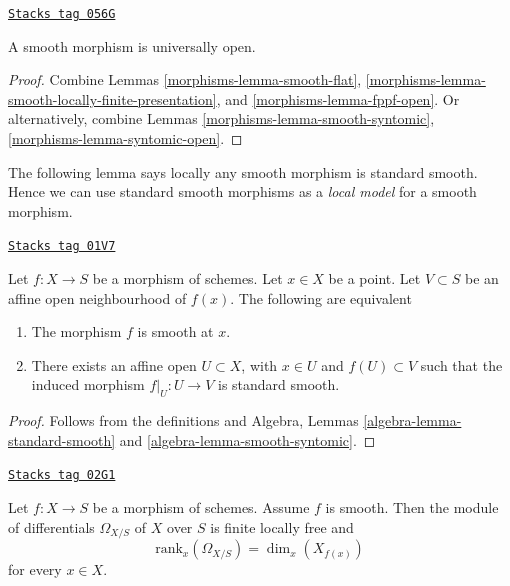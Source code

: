 \begin{lemma}
\label{morphisms-lemma-smooth-open}
\href{https://stacks.math.columbia.edu/tag/056G}{\texttt{Stacks tag 056G}}

A smooth morphism is universally open.
\end{lemma}

\begin{proof}

Combine
Lemmas \ref{morphisms-lemma-smooth-flat},
\ref{morphisms-lemma-smooth-locally-finite-presentation}, and
\ref{morphisms-lemma-fppf-open}.
Or alternatively, combine
Lemmas \ref{morphisms-lemma-smooth-syntomic},
\ref{morphisms-lemma-syntomic-open}.
\end{proof}

The following lemma says locally any smooth morphism is standard smooth.
Hence we can use standard smooth morphisms as a {\it local model}
for a smooth morphism.

\begin{lemma}
\label{morphisms-lemma-smooth-locally-standard-smooth}
\href{https://stacks.math.columbia.edu/tag/01V7}{\texttt{Stacks tag 01V7}}


Let $f : X  \to S$ be a morphism of schemes.
Let $x \in X$ be a point.
Let $V \subset S$ be an affine open neighbourhood of $f(x)$.
The following are equivalent
\begin{enumerate}
\item The morphism $f$ is smooth at $x$.
\item There exists an affine open $U \subset X$,
with $x \in U$ and $f(U) \subset V$ such that the
induced morphism $f|_U : U \to V$ is standard smooth.
\end{enumerate}
\end{lemma}

\begin{proof}
Follows from the definitions and
Algebra, Lemmas \ref{algebra-lemma-standard-smooth}
and \ref{algebra-lemma-smooth-syntomic}.
\end{proof}

\begin{lemma}
\label{morphisms-lemma-smooth-omega-finite-locally-free}
\href{https://stacks.math.columbia.edu/tag/02G1}{\texttt{Stacks tag 02G1}}

Let $f : X \to S$ be a morphism of schemes.
Assume $f$ is smooth.
Then the module of differentials $\Omega_{X/S}$ of $X$ over $S$
is finite locally free and
$$
\text{rank}_x(\Omega_{X/S}) = \dim_x(X_{f(x)})
$$
for every $x \in X$.
\end{lemma}


